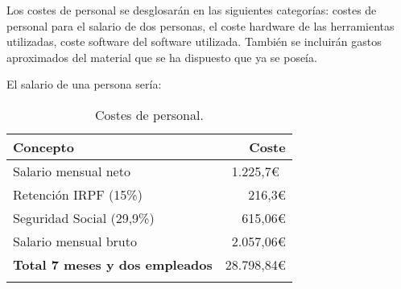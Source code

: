 Los costes de personal se desglosarán en las siguientes categorías: costes de personal para el salario de dos personas, el coste hardware de las herramientas utilizadas, coste software del software utilizada. También se incluirán gastos aproximados del material que se ha dispuesto que ya se poseía.

El salario de una persona sería:

\begin{longtable}[]{@{}lr@{}}
	\toprule
	\begin{minipage}[b]{0.38\columnwidth}\raggedright\strut
		\textbf{Concepto}\strut
	\end{minipage} & \begin{minipage}[b]{0.20\columnwidth}\raggedright\strut
		\textbf{Coste}\strut
	\end{minipage}\tabularnewline
	\midrule
	\endhead
	\begin{minipage}[t]{0.38\columnwidth}\raggedright\strut
		Salario mensual neto\strut
	\end{minipage} & \begin{minipage}[t]{0.20\columnwidth}\raggedright\strut
		1.225,7\euro{}~\cite{salariales}\strut
	\end{minipage}\tabularnewline
	\begin{minipage}[t]{0.38\columnwidth}\raggedright\strut
		Retención IRPF (15\%)\strut
	\end{minipage} & \begin{minipage}[t]{0.20\columnwidth}\raggedright\strut
		216,3\euro{}\strut
	\end{minipage}\tabularnewline
	\begin{minipage}[t]{0.38\columnwidth}\raggedright\strut
		Seguridad Social (29,9\%)\strut
	\end{minipage} & \begin{minipage}[t]{0.20\columnwidth}\raggedright\strut
		615,06\euro{}\strut
	\end{minipage}\tabularnewline
	\begin{minipage}[t]{0.38\columnwidth}\raggedright\strut
		Salario mensual bruto\strut
	\end{minipage} & \begin{minipage}[t]{0.20\columnwidth}\raggedright\strut
		2.057,06\euro{}\strut
	\end{minipage}\tabularnewline
	\midrule
	\begin{minipage}[t]{0.38\columnwidth}\raggedright\strut
		\textbf{Total 7 meses y dos empleados}\strut
	\end{minipage} & \begin{minipage}[t]{0.20\columnwidth}\raggedright\strut
		28.798,84\euro{}\strut
	\end{minipage}\tabularnewline
	\bottomrule
	\caption{Costes de personal.}
\end{longtable}

